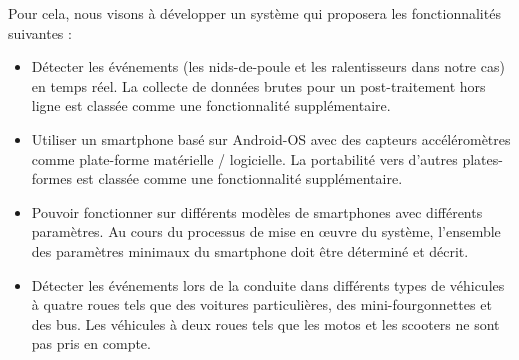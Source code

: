 Pour cela, nous visons à développer un système qui proposera les fonctionnalités suivantes :
\renewcommand{\labelitemi}{$\bullet$}
\begin{itemize}
  \item Détecter les événements (les nids-de-poule et les ralentisseurs dans notre cas) en temps réel. La collecte de données brutes pour un post-traitement hors ligne est classée comme une fonctionnalité supplémentaire.
  \item Utiliser un smartphone basé sur Android-OS avec des capteurs accéléromètres comme plate-forme matérielle / logicielle. La portabilité vers d'autres plates-formes est classée comme une fonctionnalité supplémentaire.
  \item Pouvoir fonctionner sur différents modèles de smartphones avec différents paramètres. Au cours du processus de mise en œuvre du système, l'ensemble des paramètres minimaux du smartphone doit être déterminé et décrit.
  \item Détecter les événements lors de la conduite dans différents types de véhicules à quatre roues tels que des voitures particulières, des mini-fourgonnettes et des bus. Les véhicules à deux roues tels que les motos et les scooters ne sont pas pris en compte.
\end{itemize}


\renewcommand{\thesection}{\thechapter.\arabic{section}}














